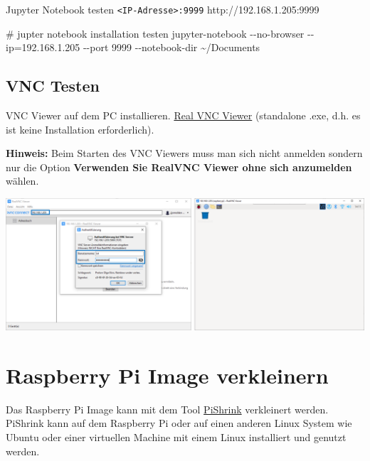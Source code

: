 \documentclass[
  11pt,
  a4paper,
  oneside, openany  ,captions=tableheading
]{scrbook}
\newenvironment{Shaded}{\begin{snugshade}}{\end{snugshade}}
\newcommand{\AttributeTok}[1]{\textcolor[rgb]{0.40,0.45,0.13}{#1}}
\newcommand{\CommentTok}[1]{\textcolor[rgb]{0.37,0.37,0.37}{#1}}
\newcommand{\ExtensionTok}[1]{\textcolor[rgb]{0.00,0.23,0.31}{#1}}
\newcommand{\NormalTok}[1]{\textcolor[rgb]{0.00,0.23,0.31}{#1}}
\newcommand{\OperatorTok}[1]{\textcolor[rgb]{0.37,0.37,0.37}{#1}}
\theoremstyle{remark}
\begin{document}
Jupyter Notebook testen
\texttt{\textless{}IP-Adresse\textgreater{}:9999}
http://192.168.1.205:9999

\begin{Shaded}
\begin{Highlighting}[]
\CommentTok{\# jupter notebook installation testen}
\ExtensionTok{jupyter{-}notebook} \AttributeTok{{-}{-}no{-}browser} \AttributeTok{{-}{-}ip}\OperatorTok{=}\NormalTok{192.168.1.205 }\AttributeTok{{-}{-}port}\NormalTok{ 9999 }\AttributeTok{{-}{-}notebook{-}dir}\NormalTok{ \textasciitilde{}/Documents}
\end{Highlighting}
\end{Shaded}

\subsection{VNC Testen}\label{vnc-testen}

VNC Viewer auf dem PC installieren.
\href{https://www.realvnc.com/en/connect/download/viewer}{Real VNC
Viewer} (standalone .exe, d.h. es ist keine Installation erforderlich).

\textbf{Hinweis:} Beim Starten des VNC Viewers muss man sich nicht
anmelden sondern nur die Option \textbf{Verwenden Sie RealVNC Viewer
ohne sich anzumelden} wählen.

\includegraphics{images/raspberrypi_realvnc.png}

\section{Raspberry Pi Image
verkleinern}\label{raspberry-pi-image-verkleinern}

Das Raspberry Pi Image kann mit dem Tool
\href{https://github.com/Drewsif/PiShrink}{PiShrink} verkleinert werden.
PiShrink kann auf dem Raspberry Pi oder auf einen anderen Linux System
wie Ubuntu oder einer virtuellen Machine mit einem Linux installiert und
genutzt werden.
\end{document}
